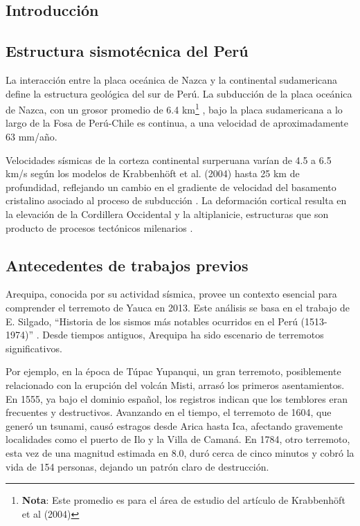\documentclass[spanish,a4paper,11pt]{article}
\begin{document}
\subsection{Introducción} 

\subsection*{Estructura sismotécnica del Perú}

La interacción entre la placa oceánica de Nazca y la continental sudamericana define la estructura geológica del sur de Perú. La subducción de la placa oceánica de Nazca, con un grosor promedio de 6.4 km\footnote{\textbf{Nota}: Este promedio es para el área de estudio del artículo de Krabbenhöft et al (2004)} \cite{Krabbenhoft2004}, bajo la placa sudamericana a lo largo de la Fosa de Perú-Chile\cite{Krabbenhoft2004} es continua, a una velocidad de aproximadamente 63 mm/año\cite{VillegasLanza2016}.

Velocidades sísmicas de la corteza continental surperuana varían de 4.5 a 6.5 km/s según los modelos de Krabbenhöft et al. (2004) hasta 25 km de profundidad, reflejando un cambio en el gradiente de velocidad del basamento cristalino asociado al proceso de subducción \cite{Krabbenhoft2004}. La deformación cortical resulta en la elevación de la Cordillera Occidental y la altiplanicie, estructuras que son producto de procesos tectónicos milenarios \cite{VillegasLanza2016}.

\subsection*{Antecedentes de trabajos previos}

Arequipa, conocida por su actividad sísmica, provee un contexto esencial para comprender el terremoto de Yauca en 2013. Este análisis se basa en el trabajo de E. Silgado, ``Historia de los sismos más notables ocurridos en el Perú (1513-1974)'' \cite{silgado_ferro_historia_1978}. Desde tiempos antiguos, Arequipa ha sido escenario de terremotos significativos. 

Por ejemplo, en la época de Túpac Yupanqui, un gran terremoto, posiblemente relacionado con la erupción del volcán Misti, arrasó los primeros asentamientos. En 1555, ya bajo el dominio español, los registros indican que los temblores eran frecuentes y destructivos. Avanzando en el tiempo, el terremoto de 1604, que generó un tsunami, causó estragos desde Arica hasta Ica, afectando gravemente localidades como el puerto de Ilo y la Villa de Camaná. En 1784, otro terremoto, esta vez de una magnitud estimada en 8.0, duró cerca de cinco minutos y cobró la vida de 154 personas, dejando un patrón claro de destrucción. 
\end{document}
